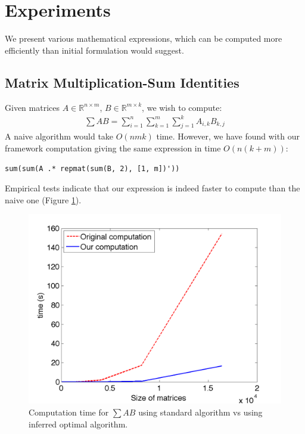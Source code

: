 \section{Experiments}

We present various mathematical expressions, which can be computed more efficiently
than initial formulation would suggest. 

\subsection{Matrix Multiplication-Sum Identities}

Given matrices $A \in \mathbb{R}^{n \times m}$, $B \in \mathbb{R}^{m
  \times k}$, we wish to compute:
\begin{gather*}
\sum AB = \sum_{i = 1}^n \sum_{k = 1}^m \sum_{j = 1}^k A_{i, k} B_{k, j} 
\end{gather*}
A naive algorithm would take $O(nmk)$ time. However, we have found with our framework 
computation giving the same expression in time $O(n(k + m))$:
\begin{lstlisting}
sum(sum(A .* repmat(sum(B, 2), [1, m])'))
\end{lstlisting}
Empirical tests indicate that our expression is indeed faster to
compute than the naive one (Figure \ref{ab}).

\begin{figure}[h]
\centering
\includegraphics[scale=0.3]{img/ab.png}
\caption{Computation time for $\sum AB$ using standard algorithm vs using inferred optimal algorithm.}
\label{ab}
\end{figure}

